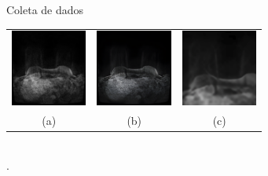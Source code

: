 \documentclass{beamer}
\begin{document}
    \begin{frame}{Coleta de dados}{\thesection \, \secname}

        \centering
        \begin{tabular}{c c c}
            \includegraphics[width=2.5cm]{img/samples/mri/mri_original.png}                 & 
            \includegraphics[width=2.5cm]{img/samples/mri/mri_non_specific_training.png}    & 
            \includegraphics[width=2.5cm]{img/samples/mri/mri_specific_training.png} \\
            (a) & (b) & (c)
        \end{tabular} \\
        .

    \end{frame}
\end{document}
